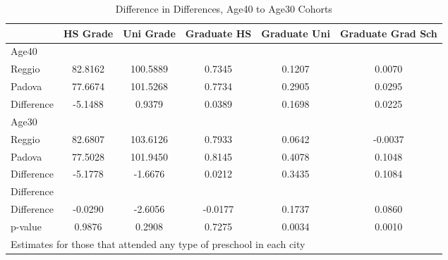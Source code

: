 \begin{table}[htbp]\centering
\caption{Difference in Differences, Age40 to Age30 Cohorts}
\begin{tabular}{l*{5}{c}}
\hline\hline
            &    HS Grade&   Uni Grade& Graduate HS&Graduate Uni&Graduate Grad Sch\\
\hline
Age40       &            &            &            &            &            \\
Reggio      &     82.8162&    100.5889&      0.7345&      0.1207&      0.0070\\
Padova      &     77.6674&    101.5268&      0.7734&      0.2905&      0.0295\\
Difference  &     -5.1488&      0.9379&      0.0389&      0.1698&      0.0225\\
\hline
Age30       &            &            &            &            &            \\
Reggio      &     82.6807&    103.6126&      0.7933&      0.0642&     -0.0037\\
Padova      &     77.5028&    101.9450&      0.8145&      0.4078&      0.1048\\
Difference  &     -5.1778&     -1.6676&      0.0212&      0.3435&      0.1084\\
\hline
Difference  &            &            &            &            &            \\
Difference  &     -0.0290&     -2.6056&     -0.0177&      0.1737&      0.0860\\
p-value     &      0.9876&      0.2908&      0.7275&      0.0034&      0.0010\\
\hline\hline
\multicolumn{6}{l}{\footnotesize Estimates for those that attended any type of preschool in each city}\\
\end{tabular}
\end{table}
